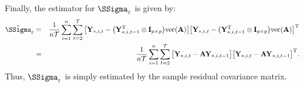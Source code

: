 \documentclass[a4paper]{article}
\theoremstyle{myexamplestyle}
\begin{document}
Finally, the estimator for $\SSigma_{\varepsilon}$ is given by:
\begin{eqnarray*}
\hat{\SSigma}_{\varepsilon} & = & \frac{1}{n \mathcal{T}}  \sum_{i=1}^n \sum_{t=2}^{\mathcal{T}}  \big[ \mathbf{Y}_{\ast,i,t} - \big( \mathbf{Y}_{\ast, i,t-1}^{\mathrm{T}}  \otimes \mathbf{I}_{p \times p} \big) \mbox{vec}(\mathbf{A})  \big] \big[ \mathbf{Y}_{\ast,i,t} - \big( \mathbf{Y}_{\ast,i,t-1}^{\mathrm{T}}  \otimes \mathbf{I}_{p \times p} \big) \mbox{vec}(\mathbf{A})  \big]^{\mathrm{T}}
\\
& = & \frac{1}{n \mathcal{T}}  \sum_{i=1}^n \sum_{t=2}^{\mathcal{T}}  \big[ \mathbf{Y}_{\ast,i,t} - \mathbf{A} \mathbf{Y}_{\ast,i,t-1}  \big] \big[ \mathbf{Y}_{\ast,i,t} - \mathbf{A} \mathbf{Y}_{\ast,i,t-1}  \big]^{\mathrm{T}}.
\end{eqnarray*}
Thus, $\SSigma_{\varepsilon}$ is simply estimated by the sample residual covariance matrix.
\end{document}
